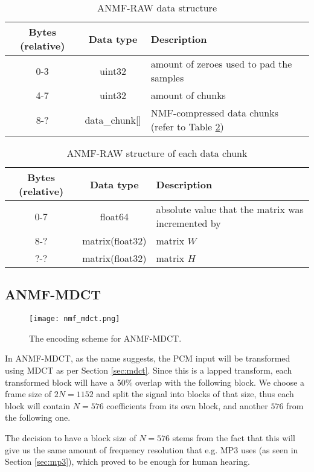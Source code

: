 \begin{table}[htbp]\caption{ANMF-RAW data structure}
	\label{tab:anmf_raw_file}
	\centering
	\begin{tabular}{|c|c|l|}
		\hline
		Bytes (relative) & Data type & Description \\ \hline
		0-3 & uint32 & amount of zeroes used to pad the samples \\
		4-7 & uint32 & amount of chunks \\
		8-? & data\_chunk[] & NMF-compressed data chunks (refer to Table \ref{tab:anmf_raw_data}) \\
		\hline
	\end{tabular}
\end{table}

\begin{table}[htbp]\caption{ANMF-RAW structure of each data chunk}
	\label{tab:anmf_raw_data}
	\centering
	\begin{tabular}{|c|c|l|}
		\hline
		Bytes (relative) & Data type & Description \\ \hline
		0-7 & float64 & absolute value that the matrix was incremented by \\
		8-? & matrix(float32) & matrix $W$ \\
		?-? & matrix(float32) & matrix $H$ \\
		\hline
	\end{tabular}
\end{table}

\subsection{ANMF-MDCT}
\begin{figure}[ht]
	\caption[ANMF-MDCT Encoder]{The encoding scheme for ANMF-MDCT.}
	\label{fig:encoding_nmf_mdct}
	\centering
	\texttt{[image: nmf\_mdct.png]}
\end{figure}

In ANMF-MDCT, as the name suggests, the PCM input will be transformed using MDCT as per Section \ref{sec:mdct}. Since this is a lapped transform, each transformed block will have a 50\% overlap with the following block. We choose a frame size of $2N = 1152$ and split the signal into blocks of that size, thus each block will contain $N = 576$ coefficients from its own block, and another $576$ from the following one.

The decision to have a block size of $N = 576$ stems from the fact that this will give us the same amount of frequency resolution that e.g. MP3 uses (as seen in Section \ref{sec:mp3}), which proved to be enough for human hearing.

